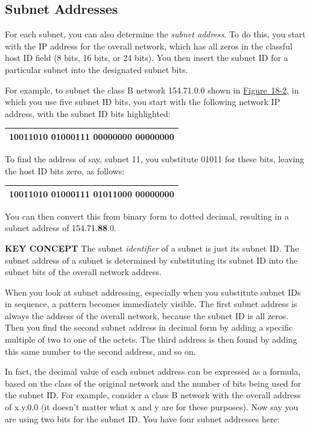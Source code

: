 \documentclass[b5paper,11pt]{memoir}
\begin{document}
\subsection[Subnet
Addresses]{\texorpdfstring{\protect\hypertarget{ch18s06.htmlux5cux23subnet_addresses}{}{}Subnet
Addresses}{Subnet Addresses}}

For each subnet, you can also determine the {\emph{subnet address}}. To
do this, you start with the IP address for the overall network, which
has all zeros in the classful host ID field (8 bits, 16 bits, or 24
bits). You then insert the subnet ID for a particular subnet into the
designated subnet bits.

For example, to subnet the class B network 154.71.0.0 shown in
\protect\hyperlink{ch18s03.htmlux5cux23determining_the_subnet_mask_of_a_subnett}{Figure~18-2},
in which you use five subnet ID bits, you start with the following
network IP address, with the subnet ID bits highlighted:

\begin{longtable}[]{@{}l@{}}
\toprule
\endhead
10011010 01000111 {\textbf{00000}}000 00000000\tabularnewline
\bottomrule
\end{longtable}

To find the address of say, subnet 11, you substitute 01011 for these
bits, leaving the host ID bits zero, as follows:

\begin{longtable}[]{@{}l@{}}
\toprule
\endhead
10011010 01000111 {\textbf{01011}}000 00000000\tabularnewline
\bottomrule
\end{longtable}

You can then convert this from binary form to dotted decimal, resulting
in a subnet address of 154.71.{\textbf{88}}.0.


{\textbf{KEY CONCEPT}} The subnet {\emph{identifier}} of a subnet is
just its subnet ID. The subnet address of a subnet is determined by
substituting its subnet ID into the subnet bits of the overall network
address.

When you look at subnet addressing, especially when you substitute
subnet IDs in sequence, a pattern becomes immediately visible. The first
subnet address is always the address of the overall network, because the
subnet ID is all zeros. Then you find the second subnet address in
decimal form by adding a specific multiple of two to one of the octets.
The third address is then found by adding this same number to the second
address, and so on.

In fact, the decimal value of each subnet address can be expressed as a
formula, based on the class of the original network and the number of
bits being used for the subnet ID. For example, consider a class B
network with the overall address of x.y.0.0 (it doesn't matter what x
and y are for these purposes). Now say you are using two bits for the
subnet ID. You have four subnet
\protect\hypertarget{ch18s06.htmlux5cux23idx-CHP-18-0740}{}{}addresses
here:
\end{document}

